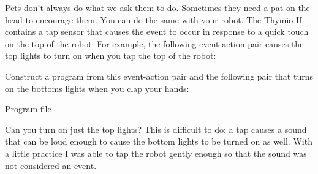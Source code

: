


Pets don't always do what we ask them to do. Sometimes they need a pat
on the head to encourage them. You can do the same with your robot. The
Thymio-II contains a tap sensor that causes the event  to
occur in response to a quick touch on the top of the robot. For example,
the following event-action pair causes the top lights to turn on when
you tap the top of the robot: 

Construct a program from this event-action pair and the following pair
that turns on the bottoms lights when you clap your hands: 

{\raggedleft \hfill Program file }

Can you turn on just the top lights? This is difficult to do: a tap
causes a sound that can be loud enough to cause the bottom lights to be
turned on as well. With a little practice I was able to tap the robot
gently enough so that the sound was not considered an event.


